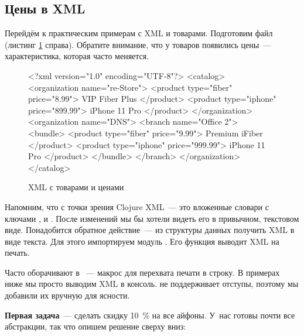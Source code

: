 \subsection{Цены в XML}


Перейдём к практическим примерам с XML и товарами. Подготовим файл
 (листинг \ref{fig:chart-xml-01} справа). Обратите
внимание, что у товаров появились цены~--- характеристика, которая часто
меняется.

\begin{figure}[ht!]

\begin{english}
  \begin{xml}
<?xml version="1.0" encoding="UTF-8"?>
<catalog>
  <organization name="re-Store">
    <product type="fiber" price="8.99">
      VIP Fiber Plus
    </product>
    <product type="iphone" price="899.99">
      iPhone 11 Pro
    </product>
  </organization>
  <organization name="DNS">
    <branch name="Office 2">
      <bundle>
        <product type="fiber" price="9.99">
          Premium iFiber
        </product>
        <product type="iphone" price="999.99">
          iPhone 11 Pro
        </product>
      </bundle>
    </branch>
  </organization>
</catalog>
  \end{xml}
\end{english}

\captionsetup{labelformat=lis}
\caption{XML с товарами и ценами}

\label{fig:chart-xml-01}

\end{figure}

Напомним, что с точки зрения Clojure XML~--- это вложенные словари с ключами
,  и . После изменений мы бы хотели видеть его в
привычном, текстовом виде. Понадобится обратное действие~--- из структуры данных
получить XML в виде текста. Для этого импортируем модуль . Его
функция  выводит XML на печать.


Часто  оборачивают в ~--- макрос для перехвата печати в
строку. В примерах ниже мы просто выводим XML в консоль.  не поддерживает
отступы, поэтому мы добавили их вручную для ясности.

\textbf{Первая задача}~--- сделать скидку 10~\% на все айфоны. У~нас готовы почти все
абстракции, так что опишем решение сверху вниз:

